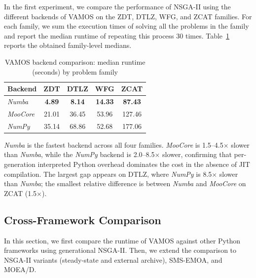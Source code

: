 \documentclass[final,5p,times,twocolumn]{elsarticle}
\newcommand{\VAMOS}{VAMOS}
\begin{document}
In the first experiment, we compare the performance of NSGA-II using the different backends of \VAMOS{} on the ZDT, DTLZ, WFG, and ZCAT families. For each family, we sum the execution times of solving all the problems in the family and report the median runtime of repeating this process 30 times. Table~\ref{tab:backends} reports the obtained family-level medians.
\begin{table}[htbp]
\centering
\caption{VAMOS backend comparison: median runtime (seconds) by problem family}
\label{tab:backends}
\begin{tabular}{lcccc}
\toprule
\textbf{Backend} & \textbf{ZDT} & \textbf{DTLZ} & \textbf{WFG} & \textbf{ZCAT} \\
\midrule
\textit{Numba} & \textbf{4.89} & \textbf{8.14} & \textbf{14.33} & \textbf{87.43} \\
\textit{MooCore} & 21.01 & 36.45 & 53.96 & 127.46 \\
\textit{NumPy} & 35.14 & 68.86 & 52.68 & 177.06 \\
\bottomrule
\end{tabular}
\end{table}

\textit{Numba} is the fastest backend across all four families. \textit{MooCore} is 1.5--4.5$\times$ slower than \textit{Numba}, while the \textit{NumPy} backend is 2.0--8.5$\times$ slower, confirming that per-generation interpreted Python overhead dominates the cost in the absence of JIT compilation. The largest gap appears on DTLZ, where \textit{NumPy} is 8.5$\times$ slower than \textit{Numba}; the smallest relative difference is between \textit{Numba} and \textit{MooCore} on ZCAT (1.5$\times$).

\subsection{Cross-Framework Comparison}
In this section, we first compare the runtime of \VAMOS{} against other Python frameworks using generational NSGA-II. Then, we extend the comparison to NSGA-II variants (steady-state and external archive), SMS-EMOA, and MOEA/D.
\end{document}
